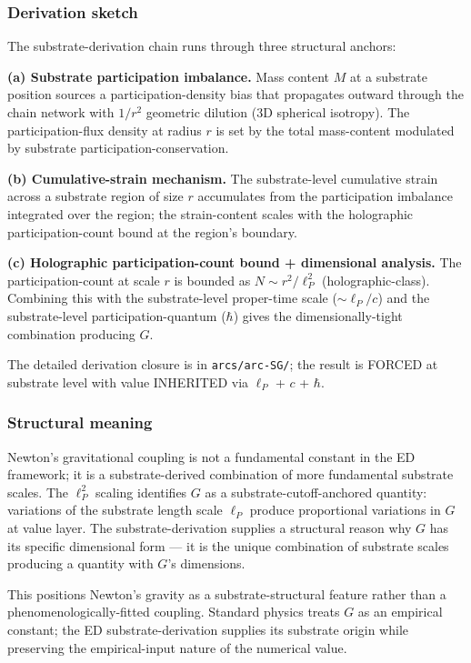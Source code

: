 \documentclass[
]{article}
\begin{document}
\subsubsection{Derivation sketch}\label{derivation-sketch}

The substrate-derivation chain runs through three structural anchors:

\textbf{(a) Substrate participation imbalance.} Mass content \(M\) at a
substrate position sources a participation-density bias that propagates
outward through the chain network with \(1/r^2\) geometric dilution (3D
spherical isotropy). The participation-flux density at radius \(r\) is
set by the total mass-content modulated by substrate
participation-conservation.

\textbf{(b) Cumulative-strain mechanism.} The substrate-level cumulative
strain across a substrate region of size \(r\) accumulates from the
participation imbalance integrated over the region; the strain-content
scales with the holographic participation-count bound at the region's
boundary.

\textbf{(c) Holographic participation-count bound + dimensional
analysis.} The participation-count at scale \(r\) is bounded as
\(N \sim r^2/\ell_P^2\) (holographic-class). Combining this with the
substrate-level proper-time scale (\(\sim \ell_P/c\)) and the
substrate-level participation-quantum (\(\hbar\)) gives the
dimensionally-tight combination producing \(G\).

The detailed derivation closure is in \texttt{arcs/arc-SG/}; the result
is FORCED at substrate level with value INHERITED via \(\ell_P\) + \(c\)
+ \(\hbar\).

\subsubsection{Structural meaning}\label{structural-meaning}

Newton's gravitational coupling is not a fundamental constant in the ED
framework; it is a substrate-derived combination of more fundamental
substrate scales. The \(\ell_P^2\) scaling identifies \(G\) as a
substrate-cutoff-anchored quantity: variations of the substrate length
scale \(\ell_P\) produce proportional variations in \(G\) at value
layer. The substrate-derivation supplies a structural reason why \(G\)
has its specific dimensional form --- it is the unique combination of
substrate scales producing a quantity with \(G\)'s dimensions.

This positions Newton's gravity as a substrate-structural feature rather
than a phenomenologically-fitted coupling. Standard physics treats \(G\)
as an empirical constant; the ED substrate-derivation supplies its
substrate origin while preserving the empirical-input nature of the
numerical value.
\end{document}
